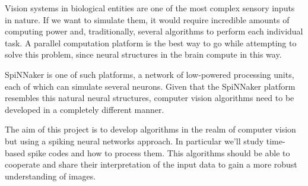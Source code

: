 Vision systems in biological entities are one of the most complex sensory
inputs in nature. If we want to simulate them, it would require incredible
amounts of computing power and, traditionally, several algorithms to perform
each individual task. A parallel computation platform is the best way to go
while attempting to solve this problem, since neural structures in the brain 
compute in this way. 

SpiNNaker is one of such platforms, a network of low-powered processing units,
each of which can simulate several neurons. Given that the SpiNNaker platform
resembles this natural neural structures, computer vision algorithms need to be
developed in a completely different manner.

The aim of this project is to develop algorithms in the realm of computer vision
but using a spiking neural networks approach. In particular we'll study 
time-based spike codes and how to process them. This algorithms should be 
able to cooperate and share their interpretation of the input data to gain a
more robust understanding of images.
